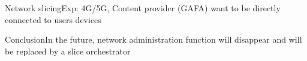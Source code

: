 \begin{frame}{Network slicing}{Exp: 4G/5G, Content provider (GAFA) want to be directly connected to users devices}
\end{frame}

\begin{frame}{Conclusion}{In the future, network administration function will disappear and will be replaced by a slice orchestrator}
\end{frame}






